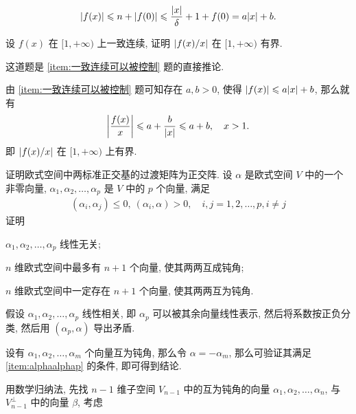 \begin{exercise}[series=exer]
\begin{answer}
      \begin{align*}
          \abs{f(x)} \leqslant n + \abs{f(0)} \leqslant \frac{\abs{x}}{\delta} + 1 + f(0) = a\abs{x} + b.
      \end{align*}
  \end{answer}
  \item 设 $ f(x) $ 在 $ [1, +\infty) $ 上一致连续, 证明 $ \abs{f(x)/x} $ 在 $ [1, +\infty) $ 有界.
  \begin{hint}
      这道题是 \ref{item:一致连续可以被控制} 题的直接推论.
  \end{hint}
  \begin{answer}
      由 \ref{item:一致连续可以被控制} 题可知存在 $ a, b > 0 $, 使得 $ \abs{f(x)} \leqslant a\abs{x} + b $, 那么就有
      \begin{align*}
          \abs{\frac{f(x)}{x}} \leqslant a + \frac{b}{\abs{x}} \leqslant a + b,\quad x > 1.
      \end{align*}
      即 $ \abs{f(x)/x} $ 在 $ [1, +\infty) $ 上有界.
  \end{answer}
  \item 证明欧式空间中两标准正交基的过渡矩阵为正交阵.
  \hitem 设 $ \alpha $ 是欧式空间 $ V $ 中的一个非零向量, $ \alpha_{1}, \alpha_{2}, \dots, \alpha_{p} $ 是 $ V $ 中的 $ p $ 个向量, 满足
  \begin{align*}
      (\alpha_{i}, \alpha_{j}) \le 0,\ (\alpha_{i}, \alpha) > 0, \quad i, j = 1, 2, \dots, p, i \ne j
  \end{align*}
  证明
  \begin{exercise}
      \item\label{item:alphaalphap} $ \alpha_{1}, \alpha_{2}, \dots, \alpha_{p} $ 线性无关;
      \item $ n $ 维欧式空间中最多有 $ n + 1 $ 个向量, 使其两两互成钝角;
      \item $ n $ 维欧式空间中一定存在 $ n + 1 $ 个向量, 使其两两互为钝角.
  \end{exercise}
  \begin{hint}
      \begin{hintsheet}
          \item 假设 $ \alpha_{1}, \alpha_{2}, \dots, \alpha_{p} $ 线性相关, 即 $ \alpha_{p} $ 可以被其余向量线性表示, 然后将系数按正负分类, 然后用 $ (\alpha_{p}, \alpha) $ 导出矛盾.
          \item 设有 $ \alpha_{1}, \alpha_{2}, \dots, \alpha_{m} $ 个向量互为钝角, 那么令 $ \alpha = -\alpha_{m} $, 那么可验证其满足 \ref{item:alphaalphap} 的条件, 即可得到结论.
          \item 用数学归纳法, 先找 $ n - 1 $ 维子空间 $ V_{n - 1} $ 中的互为钝角的向量 $ \alpha_{1}, \alpha_{2}, \dots, \alpha_{n} $, 与 $ V_{n - 1}^{\bot} $ 中的向量 $ \beta $, 考虑

\end{hintsheet}
\end{hint}
\end{exercise}
